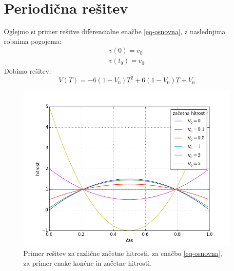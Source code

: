 \documentclass[11pt]{article}
\numberwithin{equation}{section} %
\numberwithin{table}{section} %
\begin{document}
\section{Periodična rešitev}
Oglejmo si primer rešitve diferencialne enačbe \ref{eq-osnovna}, z naslednjima robnima pogojema:
\begin{equation*}
\begin{aligned}
v(0)=v_0\\
v(t_0)=v_0
\end{aligned}
\end{equation*}
Dobimo rešitev:
\begin{equation}
V(T)=-6(1-V_0)T^2+6(1-V_0)T+V_0
\end{equation}

\begin{figure}[h]
\includegraphics[scale=0.6]{slike/cetrta.png}
\caption{Primer rešitev za različne začetne hitrosti, za enačbo \ref{eq-osnovna}, za primer enake končne in začetne hitrosti.}
\label{fig:prva}
\end{figure}

\pagebreak

%


%
%



\end{document}
